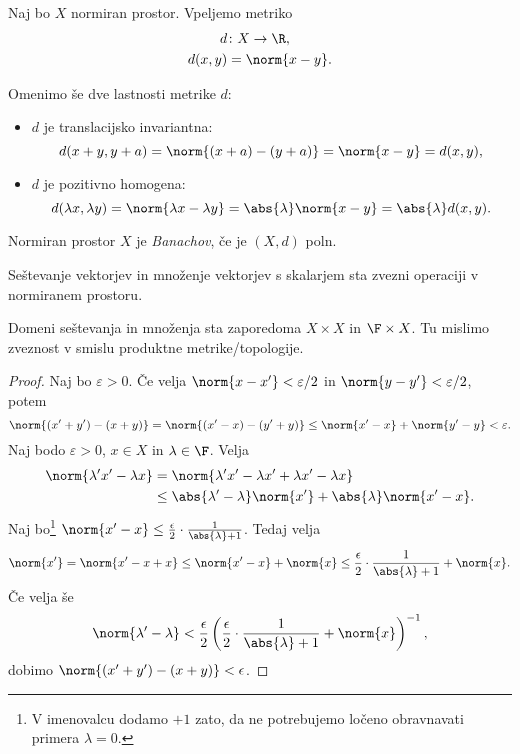 Naj bo $X$ normiran prostor. Vpeljemo metriko
\begin{align*}
    d &\colon X \to \R, \\
    d(x,y) &= \norm{x-y}.
\end{align*}

Omenimo še dve lastnosti metrike $d$:
\begin{itemize}
    \item $d$ je translacijsko invariantna:
    \[
        d(x+y,y+a) = \norm{(x+a) - (y+a)} = \norm{x-y} = d(x,y),
    \]
    \item $d$ je pozitivno homogena:
    \[
        d(\lambda x, \lambda y) = \norm{\lambda x - \lambda y} = 
        \abs{\lambda} \norm{x-y} = \abs{\lambda}d(x,y).
    \]
\end{itemize}

\begin{definicija}
    Normiran prostor $X$ je \emph{Banachov}, če je $(X, d)$ poln.
\end{definicija}

\begin{trditev}
    Seštevanje vektorjev in množenje vektorjev s skalarjem sta zvezni operaciji 
    v normiranem prostoru.
\end{trditev}
Domeni seštevanja in množenja sta zaporedoma $X \times X$ in $\F \times X$. Tu mislimo 
zveznost v smislu produktne metrike/topologije.

\begin{proof}
    Naj bo $\varepsilon > 0$. Če velja $\norm{x-x'} < \varepsilon/2$ in 
    $\norm{y-y'} < \varepsilon/2$, potem
    \[
        \norm{(x'+y') - (x+y)} = \norm{(x'-x) - (y'+y)} \le \norm{x'-x} 
        + \norm{y'-y} < \varepsilon.
    \]
    Naj bodo $\varepsilon > 0$, $x \in X$ in $\lambda \in \F$. Velja
    \begin{align*}
        \norm{\lambda' x' - \lambda x} &= \norm{\lambda'x' -\lambda x' + \lambda x' - \lambda x} \\
        &\le \abs{\lambda'-\lambda} \norm{x'} + \abs{\lambda} \norm{x'-x}.
    \end{align*}
    Naj bo\footnote{V imenovalcu dodamo $+1$ zato, da ne potrebujemo ločeno obravnavati primera $\lambda = 0$.} 
    $\norm{x'-x} \le \frac{\epsilon}{2} \cdot \frac{1}{\abs{\lambda} + 1}$. Tedaj velja
    \[
        \norm{x'} = \norm{x' -x +x} \le \norm{x'-x}+ \norm{x} \le \frac{\epsilon}{2} \cdot \frac{1}{\abs{\lambda} + 1} + \norm{x}.
    \]
    Če velja še
    \[
        \norm{\lambda' - \lambda} < \frac{\epsilon}{2} 
        \left(\frac{\epsilon}{2} \cdot \frac{1}{\abs{\lambda} + 1} + \norm{x}\right)^{-1},
    \]
    dobimo $\norm{(x'+y') - (x+y)} < \epsilon$.
\end{proof}

